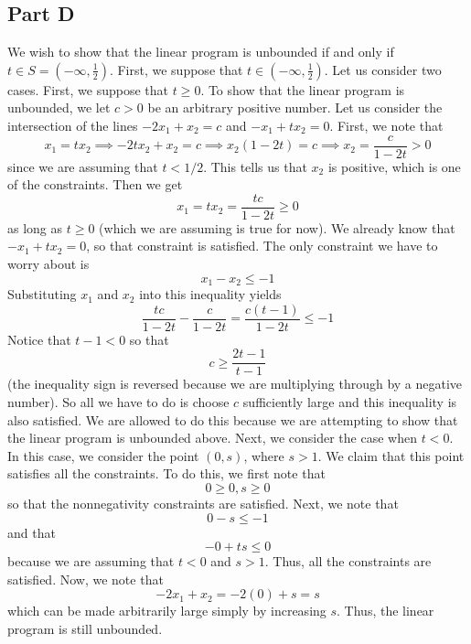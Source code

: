 \documentclass[12pt]{article}
\begin{document}
\subsection*{Part D}
We wish to show that the linear program is unbounded if and only if $t \in S = (-\infty,\frac{1}{2})$. First, we suppose that $t \in (-\infty,\frac{1}{2})$. Let us consider two cases. First, we suppose that $t\geq 0$. To show that the linear program is unbounded, we let $c > 0$ be an arbitrary positive number. Let us consider the intersection of the lines $-2x_1 + x_2 = c$ and $-x_1 + tx_2 = 0$. First, we note that 
\[
x_1 = tx_2 \implies -2tx_2 + x_2 = c \implies x_2(1-2t) = c \implies x_2 = \frac{c}{1-2t} > 0
\] since we are assuming that $t < 1/2$. This tells us that $x_2$ is positive, which is one of the constraints. Then we get
\[
x_1 = tx_2 = \frac{tc}{1-2t} \geq 0
\] as long as $t \geq 0$ (which we are assuming is true for now). We already know that $-x_1 + tx_2 = 0$, so that constraint is satisfied. The only constraint we have to worry about is
\[
x_1 - x_2 \leq -1
\] Substituting $x_1$ and $x_2$ into this inequality yields
\[
\frac{tc}{1-2t} -  \frac{c}{1-2t} = \frac{c(t-1)}{1-2t} \leq -1
\] Notice that $t-1 < 0$ so that
\[
c \geq \frac{2t-1}{t-1}
\] (the inequality sign is reversed because we are multiplying through by a negative number). So all we have to do is choose $c$ sufficiently large and this inequality is also satisfied. We are allowed to do this because we are attempting to show that the linear program is unbounded above. Next, we consider the case when $t < 0$. In this case, we consider the point $(0,s)$, where $s > 1$. We claim that this point satisfies all the constraints. To do this, we first note that
\[
0\geq 0, s\geq 0
\] so that the nonnegativity constraints are satisfied. Next, we note that
\[
0 - s \leq -1
\] and that
\[
-0 + ts \leq 0
\] because we are assuming that $t <0$ and $s > 1$. Thus, all the constraints are satisfied. Now, we note that
\[
-2x_1 + x_2 = -2(0) + s = s
\] which can be made arbitrarily large simply by increasing $s$. Thus, the linear program is still unbounded.
\end{document}
